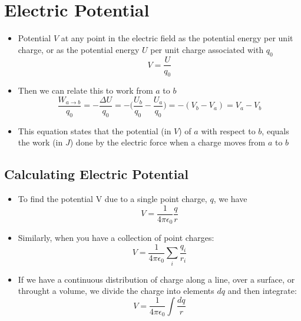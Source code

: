 \documentclass[11pt, a4paper]{article}
\begin{document}
\section[23.2, Electric Potential]{Electric Potential}
\begin{itemize}
    \item Potential $V$ at any point in the electric field as the potential energy per
        unit charge, or as the potential energy $U$ per unit charge associated with $q_0$
        \begin{equation}
            V = \frac{U}{q_0}
        \end{equation}
    \item Then we can relate this to work from $a$ to $b$
        \begin{equation}
            \frac{W_{a\rightarrow b}}{q_0} = - \frac{\Delta U}{q_0} =
            -\bigg(\frac{U_b}{q_0} - \frac{U_a}{q_0} \bigg) =
            -(V_b - V_a) = V_a - V_b
        \end{equation}
    \item This equation states that the potential (in $V$) of $a$ with respect to $b$,
        equals the work (in $J$) done by the electric force when a charge moves from $a$
        to $b$
\end{itemize}

\subsection{Calculating Electric Potential}
\begin{itemize}
    \item To find the potential V due to a single point charge, $q$, we have
        \begin{equation}
            V = \frac{1}{4\pi\epsilon_0}\frac{q}{r}
        \end{equation}
    \item Similarly, when you have a collection of point charges:
        \begin{equation}
            V = \frac{1}{4\pi\epsilon_0}\sum_i \frac{q_i}{r_i}
        \end{equation}
    \item If we have a continuous distribution of charge along a line, over a surface, or
        throught a volume, we divide the charge into elements $dq$ and then integrate:
        \begin{equation}
            V = \frac{1}{4\pi\epsilon_0}\int \frac{dq}{r}
        \end{equation}
\end{itemize}
\end{document}
